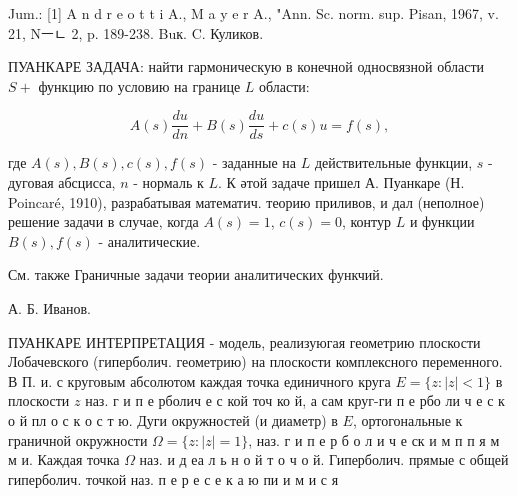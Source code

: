 \documentclass[10pt]{article}
\begin{document}
Jum.: [1] A n d r e o t t i A., M a y e r A., "Ann. Sc. norm. sup. Pisan, 1967, v. 21, Nㅡㄴ 2, p. 189-238. Buк. C. Куликов.



ПУАНКАРЕ ЗАДАЧА: найти гармоническую в конечной односвязной области $S+$ функцию по условию на границе $L$ области:



\[

A(s) \frac{d u}{d n}+B(s) \frac{d u}{d s}+c(s) u=f(s),

\]



где $A(s), B(s), c(s), f(s)$ - заданные на $L$ действительные функции, $s$ - дуговая абсцисса, $n$ - нормаль к $L$. К әтой задаче пришел А. Пуанкаре (Н. Poincaré, 1910), разрабатывая математич. теорию приливов, и дал (неполное) решение задачи в случае, когда $A(s)=1$, $c(s)=0$, контур $L$ и функции $B(s), f(s)$ - аналитические.



См. также Граничные задачи теории аналитических функчий.



А. Б. Иванов.



ПУАНКАРЕ ИНТЕРПРЕТАЦИЯ - модель, реализуюгая геометрию плоскости Лобачевского (гиперболич. геометрию) на плоскости комплексного переменного. В П. и. с круговым абсолютом каждая точка единичного круга $E=\{z:|z|<1\}$ в плоскости $z$ наз. г и п е рболич е с кой точ ко й, а сам круг-ги п е рбо ли ч е с к о й пл о с к о с т ю. Дуги окружностей (и диаметр) в $E$, ортогональные к граничной окружности $\Omega=\{z:|z|=1\}$, наз. г и п е р б о л и ч е ск и м п п я м м и. Каждая точка $\Omega$ наз. и д еа л ь н о й т о ч о й. Гиперболич. прямые с общей гиперболич. точкой наз. п е р е с е к а ю пи и м и с я
\end{document}
